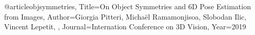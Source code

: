@article{objsymmetries,
Title={On Object Symmetries and 6D Pose Estimation from Images},
Author={Giorgia Pitteri, Michaël Ramamonjisoa, Slobodan Ilic, Vincent Lepetit, },
Journal={Internation Conference on 3D Vision},
Year={2019}} 
